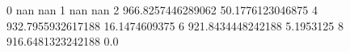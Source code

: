 0 nan nan
1 nan nan
2 966.8257446289062 50.1776123046875
4 932.7955932617188 16.1474609375
6 921.8434448242188 5.1953125
8 916.6481323242188 0.0
